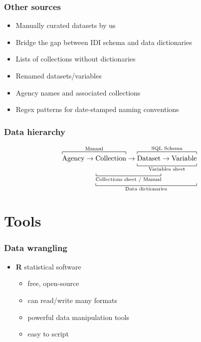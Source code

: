 \documentclass{beamer}
\newcommand{\prog}[1]{\textsf{\bfseries #1}}
\begin{document}
\begin{frame}
    \frametitle{Other sources}

    \begin{itemize}
        \item Manually curated datasets by us
        \item Bridge the gap between IDI schema and data dictionaries\\[2em]
        \item Lists of collections without dictionaries
        \item Renamed datasets/variables
        \item Agency names and associated collections
        \item Regex patterns for date-stamped naming conventions
    \end{itemize}
\end{frame}

\begin{frame}
    \frametitle{Data hierarchy}

    \begin{center}

        \begin{align*}
            \overbracket[0.5pt]{\strut
            \text{Agency} \rightarrow
                \text{Collection}}^{\text{Manual}}
            \rightarrow
                    \underbracket[0.5pt]{\overbracket[0.5pt]{\strut
                    \text{Dataset} \rightarrow \text{Variable}
                    }^{\text{SQL Schema}}
                    }_{\text{Variables sheet}} \\[-1em]
                \hphantom{\text{Agency} \rightarrow}
                \underbracket[0.5pt]{
                \underbracket[0.5pt]{\hphantom{
                    \text{Collection} \rightarrow \text{Dataset}
                }}_{\text{Collections sheet / Manual}}
                \hphantom{\rightarrow \text{Variable}}
                }_{\text{Data dictionaries}}
        \end{align*}
    \end{center}
\end{frame}

\section{Tools}

\begin{frame}
    \frametitle{Data wrangling}

    \begin{itemize}
        \item \prog{R} statistical software
        \begin{itemize}
            \item free, open-source
            \item can read/write many formats
            \item powerful data manipulation tools
            \item easy to script
        \end{itemize}
    \end{itemize}
\end{frame}
\end{document}
